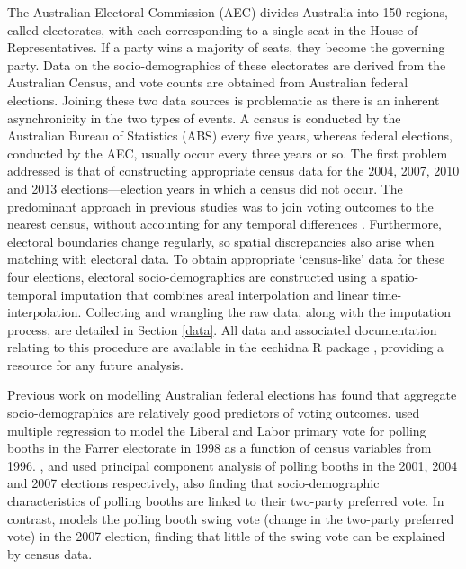 \documentclass[
  times, doublespace]{anzsauth}
\begin{document}
The Australian Electoral Commission (AEC) divides Australia into 150 regions, called electorates, with each corresponding to a single seat in the House of Representatives. If a party wins a majority of seats, they become the governing party. Data on the socio-demographics of these electorates are derived from the Australian Census, and vote counts are obtained from Australian federal elections. Joining these two data sources is problematic as there is an inherent asynchronicity in the two types of events. A census is conducted by the Australian Bureau of Statistics (ABS) every five years, whereas federal elections, conducted by the AEC, usually occur every three years or so. The first problem addressed is that of constructing appropriate census data for the 2004, 2007, 2010 and 2013 elections---election years in which a census did not occur. The predominant approach in previous studies was to join voting outcomes to the nearest census, without accounting for any temporal differences \citep[see][]{DavisStimson98, Stimson06, Liao09, Stimson09}. Furthermore, electoral boundaries change regularly, so spatial discrepancies also arise when matching with electoral data. To obtain appropriate `census-like' data for these four elections, electoral socio-demographics are constructed using a spatio-temporal imputation that combines areal interpolation \citep{Goodchild1993} and linear time-interpolation. Collecting and wrangling the raw data, along with the imputation process, are detailed in Section \ref{data}. All data and associated documentation relating to this procedure are available in the \textsf{eechidna} \textsf{R} package \citep{eechidna}, providing a resource for any future analysis.

Previous work on modelling Australian federal elections has found that aggregate socio-demographics are relatively good predictors of voting outcomes. \citet{Forrest01} used multiple regression to model the Liberal and Labor primary vote for polling booths in the Farrer electorate in 1998 as a function of census variables from 1996. \citet{Stimson06}, \citet{Stimson09} and \citet{Stimson12} used principal component analysis of polling booths in the 2001, 2004 and 2007 elections respectively, also finding that socio-demographic characteristics of polling booths are linked to their two-party preferred vote. In contrast, \citet{Stimson09} models the polling booth swing vote (change in the two-party preferred vote) in the 2007 election, finding that little of the swing vote can be explained by census data.
\end{document}
